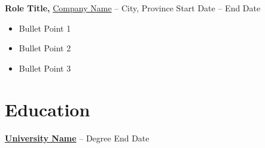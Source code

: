 \documentclass[11pt]{article}       %
\begin{document}
	\textbf{Role Title,} \href{https://company.com}{Company Name} -- City, Province \hfill Start Date -- End Date \\
	\vspace{-9pt}
	\begin{itemize}
		\item Bullet Point 1
		\item Bullet Point 2
		\item Bullet Point 3
	\end{itemize}
	
	\vspace{-18.5pt}
	
	\section*{Education}
	\textbf{\href{https://university.com}{University Name}} -- Degree \hfill End Date \\
	
\end{document}
